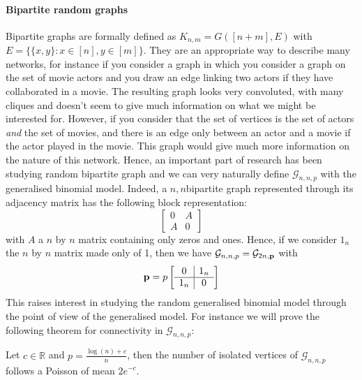 \paragraph{Bipartite random graphs}
Bipartite graphs are formally defined as $K_{n,m} = G([n+m], E)$ with $E=\{\{x,y\} : x\in[n], y\in[m]\}$.
They are an appropriate way to describe many networks, for instance if you consider a graph in which you consider a graph on the set of movie actors and you draw an edge linking two actors if they have collaborated in a movie.
The resulting graph looks very convoluted, with many cliques and doesn't seem to give much information on what we might be interested for.
However, if you consider that the set of vertices is the set of actors \emph{and} the set of movies, and there is an edge only between an actor and a movie if the actor played in the movie.
This graph would give much more information on the nature of this network.
\newline
Hence, an important part of research has been studying random bipartite graph and we can very naturally define $\mathcal{G}_{n,n, p}$ with the generalised binomial model.
Indeed, a $n,n$bipartite graph represented through its adjacency matrix has the following block representation:
\begin{equation}
    \left[
\begin{array}{c|c}
        0 & A \\
         \hline
        A & 0
        \end{array}
\right]
\end{equation}
with $A$ a $n$ by $n$ matrix containing only zeros and ones.
Hence, if we consider $1_n$ the $n$ by $n$ matrix made only of 1, then we have $\mathcal{G}_{n,n,p} = \mathcal{G}_{2n,\bold{p}}$ with
\begin{equation}\label{eq:pMat}
    \bold{p} = p\left[
\begin{array}{c|c}
        0 & 1_n \\
         \hline
        1_n & 0
        \end{array}
\right]
\end{equation}
This raises interest in studying the random generalised binomial model through the point of view of the generalised model.
For instance we will prove the following theorem for connectivity in $\mathcal{G}_{n,n,p}$:
\begin{theorem}
	Let $c\in \mathbb{R}$ and $p=\frac{\log(n) + c}{n}$, then the number of isolated vertices of $\mathcal{G}_{n,n,p}$  follows a Poisson of mean $2e^{-c}$.
\end{theorem}
